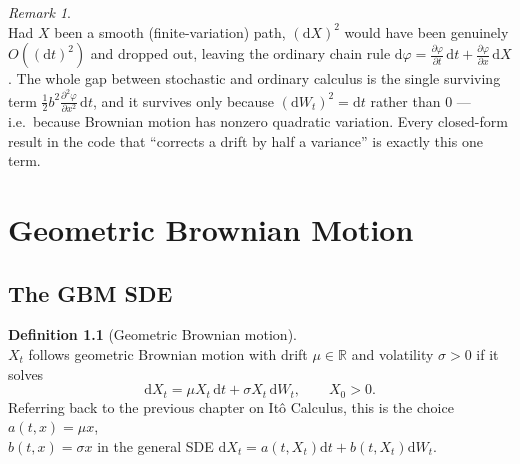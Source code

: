 \documentclass[11pt]{report}
\newcommand{\dd}{\mathrm{d}}
\newcommand{\dW}{\dd W_t}
\newcommand{\dt}{\dd t}
\newcommand{\R}{\mathbb{R}}
\newcommand{\drift}{a}
\newcommand{\diff}{b}
\theoremstyle{plain}
\theoremstyle{definition}
\newtheorem{definition}{Definition}[chapter]
\theoremstyle{remark}
\newtheorem{remark}{Remark}[chapter]
\numberwithin{equation}{chapter}
\begin{document}
\begin{remark}
\leavevmode\\
Had $X$ been a smooth (finite-variation) path, $(\dd X)^2$ would have been
genuinely $O((\dt)^2)$ and dropped out, leaving the ordinary chain rule
$\dd \varphi = \frac{\partial\varphi}{\partial t}\,\dt + \frac{\partial\varphi}{\partial x}\,\dd X$. The whole gap between stochastic and ordinary
calculus is the single surviving term $\frac{1}{2}\diff^2 \frac{\partial^2\varphi}{\partial x^2}\,\dt$, and it
survives only because $(\dW)^2=\dt$ rather than $0$ --- i.e.\ because Brownian
motion has nonzero quadratic variation. Every closed-form result in
the code that ``corrects a drift by half a variance''
is exactly this one term.
\end{remark}

\chapter{Geometric Brownian Motion}

\section{The GBM SDE}

\begin{definition}[Geometric Brownian motion]\label{def:gbm}
\leavevmode\\
  $X_t$ follows geometric Brownian motion with drift $\mu\in\R$ and
volatility $\sigma>0$ if it solves
\begin{equation}\label{eq:gbmsde}
   \dd X_t = \mu X_t\,\dt + \sigma X_t\,\dW, \qquad X_0>0.
\end{equation}
Referring back to the previous chapter on It\^o Calculus, this is the choice
$\drift(t,x)=\mu x$, \\$\diff(t,x)=\sigma x$ in the general SDE
$\dd X_t = \drift(t,X_t)\dt+\diff(t,X_t)\dW$.
\end{definition}
\end{document}
